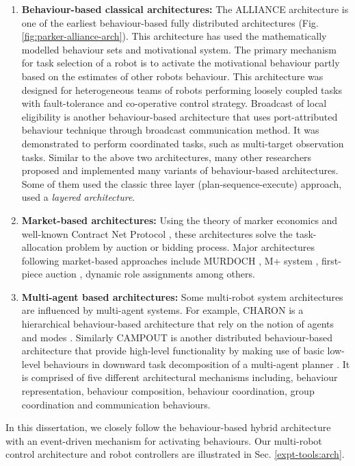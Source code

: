 \begin{enumerate}
\item \textbf{Behaviour-based classical architectures: }
The ALLIANCE architecture \cite{Parker1998} is one of the earliest behaviour-based fully distributed architectures (Fig. \ref{fig:parker-alliance-arch}). This architecture has used the mathematically modelled behaviour sets and motivational system. The primary mechanism for task selection of a robot is to activate the motivational behaviour partly based on the estimates of other robots behaviour. This architecture was designed for heterogeneous teams of robots performing loosely coupled tasks with fault-tolerance and co-operative control strategy. Broadcast of local eligibility  \cite{Werger2001} is another behaviour-based architecture that uses port-attributed behaviour technique through broadcast communication method. It was demonstrated to perform coordinated tasks, such as multi-target observation tasks. Similar to the above two architectures, many other researchers proposed and implemented many variants of behaviour-based architectures. Some of them used the classic three layer (plan-sequence-execute) approach, \cite{Simmons+2002} used a {\em layered architecture}.
%
\item \textbf{Market-based architectures: }
Using the theory of marker economics and well-known Contract Net Protocol \cite{Davis1988+}, these architectures solve the task-allocation problem by auction or bidding process. Major architectures following market-based approaches include MURDOCH \cite{Gerkey+2002}, M+ system \cite{Botelho+1999}, first-piece auction \cite{Zlot+2002}, dynamic role assignments \cite{Chaimowicz2002} among others.
%
\item \textbf{Multi-agent based architectures: }
Some multi-robot system architectures are influenced by multi-agent systems. For example, CHARON is a hierarchical behaviour-based architecture that rely on the notion of agents and modes \cite{Chaimowicz2002}. Similarly CAMPOUT is another distributed behaviour-based architecture that provide high-level functionality by making use of basic low-level behaviours in downward task decomposition of a multi-agent planner \cite{Huntsberger+2003}. It is comprised of five different architectural mechanisms including, behaviour representation, behaviour composition, behaviour coordination, group coordination and communication behaviours.
\end{enumerate}
In this dissertation, we closely follow the behaviour-based hybrid architecture with an event-driven mechanism for activating behaviours. Our multi-robot control architecture and robot controllers are illustrated in Sec. \ref{expt-tools:arch}.
